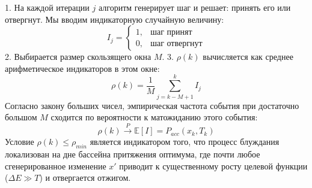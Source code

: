 1. На каждой итерации $j$ алгоритм генерирует шаг и решает: принять его или отвергнут. Мы вводим индикаторную случайную величину:
   $$ I_j = \begin{cases} 1, & \text{шаг принят} \\ 0, & \text{шаг отвергнут} \end{cases} $$
2. Выбирается размер скользящего окна $M$.
3. $\rho(k)$ вычисляется как среднее арифметическое индикаторов в этом окне:
   $$ \rho(k) = \frac{1}{M} \sum_{j=k-M+1}^{k} I_j $$
Согласно закону больших чисел, эмпирическая частота события при достаточно большом $M$ сходится по вероятности к матожиданию этого события:
$$ \rho(k) \xrightarrow{P} \mathbb{E}[I] = P_{acc}(x_k, T_k) $$
Условие $\rho(k) \le \rho_{min}$ является индикатором того, что процесс блуждания локализован на дне бассейна притяжения оптимума, где почти любое сгенерированное изменение $x'$ приводит к существенному росту целевой функции ($\Delta E \gg T$) и отвергается отжигом.
\newpage

